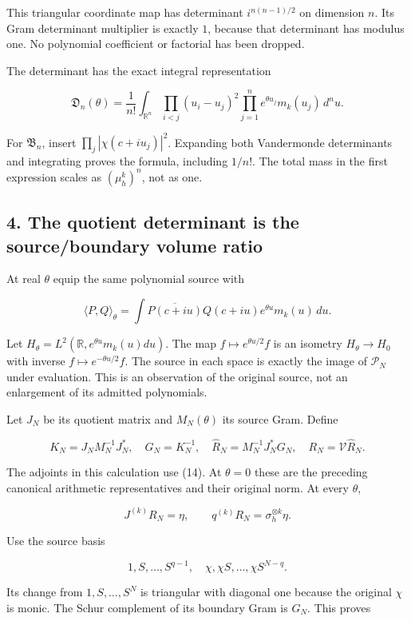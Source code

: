 This triangular coordinate map has determinant \(i^{n(n-1)/2}\) on
dimension \(n\). Its Gram determinant multiplier is exactly \(1\),
because that determinant has modulus one. No polynomial coefficient or
factorial has been dropped.

The determinant has the exact integral representation

\[
\mathfrak D_n(\theta)=\frac1{n!}\int_{\mathbb R^n}
\prod_{i<j}(u_i-u_j)^2
\prod_{j=1}^ne^{\theta u_j}m_k(u_j)\,d^nu.
\tag{13}
\]

For \(\mathfrak B_n\), insert \(\prod_j|\chi(c+iu_j)|^2\). Expanding
both Vandermonde determinants and integrating proves the formula,
including \(1/n!\). The total mass in the first expression scales as
\((\mu_h^k)^n\), not as one.

\subsection{4. The quotient determinant is the source/boundary volume
ratio}\label{toda_volume:the-quotient-determinant-is-the-sourceboundary-volume-ratio}

At real \(\theta\) equip the same polynomial source with

\[
\langle P,Q\rangle_\theta
=\int\overline{P(c+iu)}Q(c+iu)e^{\theta u}m_k(u)\,du.
\tag{14}
\]

Let \(H_\theta=L^2(\mathbb R,e^{\theta u}m_k(u)du)\). The map
\(f\mapsto e^{\theta u/2}f\) is an isometry \(H_\theta\to H_0\) with
inverse \(f\mapsto e^{-\theta u/2}f\). The source in each space is
exactly the image of \(\mathcal P_N\) under evaluation. This is an
observation of the original source, not an enlargement of its admitted
polynomials.

Let \(J_N\) be its quotient matrix and \(M_N(\theta)\) its source Gram.
Define

\[
K_N=J_NM_N^{-1}J_N^*,\quad G_N=K_N^{-1},\quad
\widehat R_N=M_N^{-1}J_N^*G_N,\quad R_N=\mathcal V\widehat R_N.
\tag{15}
\]

The adjoints in this calculation use (14). At \(\theta=0\) these are the
preceding canonical arithmetic representatives and their original norm.
At every \(\theta\),

\[
J^{(k)}R_N=\eta,\qquad q^{(k)}R_N=\sigma_h^{\otimes k}\eta.
\]

Use the source basis

\[
1,S,\ldots,S^{q-1},\quad\chi,\chi S,\ldots,\chi S^{N-q}.
\]

Its change from \(1,S,\ldots,S^N\) is triangular with diagonal one
because the original \(\chi\) is monic. The Schur complement of its
boundary Gram is \(G_N\). This proves


